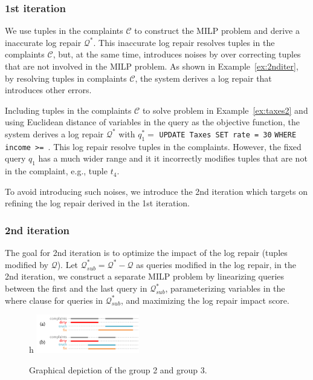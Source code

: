 \subsubsection{1st iteration}
We use tuples in the complaints $\mathcal{C}$ to construct the MILP problem and derive a 
inaccurate log repair $\mathcal{Q}^*$. This inaccurate 
log repair resolves tuples in the complaints $\mathcal{C}$, but, at the same time, 
introduces noises by over correcting tuples that are not involved in the MILP problem. 
As shown in Example~\ref{ex:2nditer}, by resolving tuples in complaints $\mathcal{C}$, 
the system derives a log repair that introduces other errors. 
\begin{example}\label{ex:2nditer}
Including tuples in the complaints $\mathcal{C}$ to solve problem in Example~\ref{ex:taxes2} 
and using Euclidean distance of variables in the query as the objective function, the system 
derives a log repair $\mathcal{Q}^*$ with $q_1^*=$ \texttt{\small UPDATE Taxes SET rate = 30}
\texttt{\small WHERE income >= \color{red}{9500.0001} \color{black}{and income <=} \color{red}{90000}}. 
This log repair resolve tuples in the complaints. However, the fixed query $q_1$ has a much wider range 
and it it incorrectly modifies tuples that are not in the complaint, e.g., tuple $t_4$.
\end{example}


To avoid introducing such noises, we introduce the 
2nd iteration which targets on refining the log repair derived in 
the 1st iteration. 
\subsubsection{2nd iteration}
The goal for 2nd iteration is to optimize the impact of the log repair (tuples
modified by $\mathcal{Q}$). 
Let $\mathcal{Q}^*_{sub} = \mathcal{Q}^*-\mathcal{Q}$ as 
queries modified in the log repair, in the 2nd iteration, we 
construct a separate MILP problem by linearizing 
 queries between the first and the last query in
$\mathcal{Q}^*_{sub}$, parameterizing variables in 
the where clause for queries in $\mathcal{Q}^*_{sub}$,
and maximizing the log repair impact score. 

\begin{figure}{h}
    \centering
    \includegraphics[width=0.4\textwidth]{figures/2nditerationgroups}
    \caption{Graphical depiction of the group 2 and group 3. }
    \label{fig:groups}
\end{figure}

